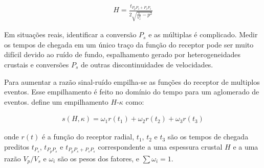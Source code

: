 \begin{eqnarray}
H = \frac{t_{P_{p}P_{s}+P_{s}P_{s}}}{{2\sqrt{\frac{1}{V_{s}^{2}}- p^{2}}}}
\end{eqnarray}

Em situações reais, identificar a conversão $P_{s}$ e as múltiplas é complicado. Medir os tempos de chegada em um único traço da função do receptor pode ser muito difícil devido ao ruído de fundo, espalhamento gerado por heterogeneidades crustais e conversões $P_{s}$ de outras discontinuidades de velocidades.

Para aumentar a razão sinal-ruído empilha-se as funções do receptor de multiplos eventos. Esse empilhamento é feito no domínio do tempo para um aglomerado de eventos. \cite{Zhu_Kanamori_2000} define um empilhamento $H$-$\kappa$ como:

\begin{eqnarray} \label{Hk_stack}
s(H,\kappa) = \omega_{1}r(t_{1}) + \omega_{2}r(t_{2}) + \omega_{3}r(t_{3})
\end{eqnarray}

onde $r(t)$ é a função do receptor radial, $t_{1}$, $t_{2}$ e $t_{3}$ são os tempos de chegada preditos  $t_{P_{s}}$,  $t_{P_{p}P_{s}}$ e  $t_{P_{p}P_{s}+P_{s}P_{s}}$ correspondente a uma espessura crustal $H$ e a uma razão $V_{p}/V_{s}$ e $\omega_{i}$ são os pesos dos fatores, e $\sum \omega_{i} = 1$. 

